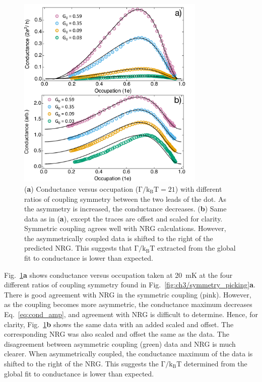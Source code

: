 \begin{figure}[!bht]
 \begin{center}
 \includegraphics[width=0.8\textwidth]{figures/ch3/figure19.pdf}
 \caption[Conductance versus Occupation : Varying coupling symmetry]{\label{fig:ch3/cond_occ_assymetry} 
 (\textbf{a}) Conductance versus occupation ($\mathrm{\Gamma/k_BT=21}$) with different ratios of coupling symmetry between the two leads of the dot. As the asymmetry is increased, the conductance decreases.
 (\textbf{b}) Same data as in (\textbf{a}), except the traces are offset and scaled for clarity. Symmetric coupling agrees well with NRG calculations. However, the asymmetrically coupled data is shifted to the right of the predicted NRG. This suggests that $\mathrm{\Gamma/k_BT}$ extracted from the global fit to conductance is lower than expected.}
 \end{center}
\end{figure}


Fig.~\ref{fig:ch3/cond_occ_assymetry}\textbf{a} shows conductance versus occupation taken at \qty{20}{mK} at the four different ratios of coupling symmetry found in Fig.~\ref{fig:ch3/symmetry_picking}\textbf{a}. There is good agreement with NRG in the symmetric coupling (pink). However, as the coupling becomes more asymmetric, the conductance maximum decreases Eq.~\ref{eq:cond_amp}, and agreement with NRG is difficult to determine. Hence, for clarity, Fig.~\ref{fig:ch3/cond_occ_assymetry}\textbf{b} shows the same data with an added scaled and offset. The corresponding NRG was also scaled and offset the same as the data. The disagreement between asymmetric coupling (green) data and NRG is much clearer. When asymmetrically coupled, the conductance maximum of the data is shifted to the right of the NRG. This suggests the $\mathrm{\Gamma/k_BT}$ determined from the global fit to conductance is lower than expected. 

